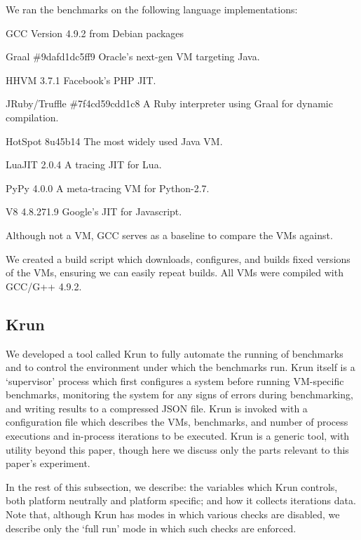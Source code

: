 \documentclass[a4paper,UKenglish]{lipics}
\newcommand{\krun}{Krun\xspace}
\begin{document}
We ran the benchmarks on the following language implementations:
\begin{description*}
\item[GCC] Version 4.9.2 from Debian packages
\item[Graal \#9dafd1dc5ff9] Oracle's next-gen VM targeting Java.
\item[HHVM 3.7.1] Facebook's PHP JIT.
\item[JRuby/Truffle \#7f4cd59cdd1c8] A Ruby interpreter using Graal for dynamic compilation.
\item[HotSpot 8u45b14] The most widely used Java VM.
\item[LuaJIT 2.0.4] A tracing JIT for Lua.
\item[PyPy 4.0.0] A meta-tracing VM for Python-2.7.
\item[V8 4.8.271.9] Google's JIT for Javascript.
\end{description*}
%
Although not a VM, GCC serves as a baseline to compare the VMs against.

We created a build script which downloads, configures, and builds fixed
versions of the
VMs, ensuring we can easily repeat builds.
All VMs were compiled with GCC/G++ 4.9.2.


\subsection{\krun}

We developed a tool called \krun to fully automate the running of benchmarks
and to control the environment under which the benchmarks run. \krun itself is a
`supervisor' process which first configures a system before running VM-specific
benchmarks, monitoring the system for any signs of errors during benchmarking,
and writing results to a compressed JSON file. \krun is invoked with a
configuration file which describes the VMs, benchmarks, and number of process
executions and in-process iterations to
be executed. \krun is a generic tool, with utility beyond this paper, though
here we discuss only the parts relevant to this paper's experiment.

In the rest
of this subsection, we describe: the variables which \krun controls, both
platform neutrally and platform specific; and how it collects iterations data.
Note that, although \krun has modes in which various checks are disabled, we
describe only the `full run' mode in which such checks are enforced.
\end{document}
